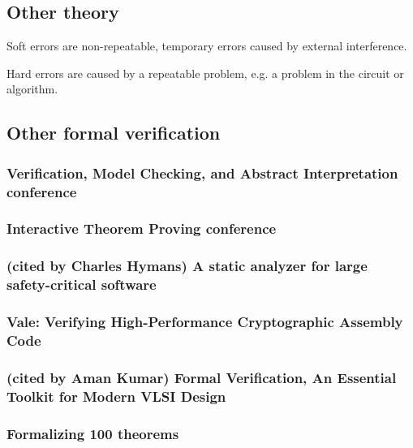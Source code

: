 \documentclass{article}
\begin{document}
\subsection{Other theory}

Soft errors are non-repeatable, temporary errors caused by external interference.

Hard errors are caused by a repeatable problem, e.g. a problem in the circuit or algorithm.


\subsection{Other formal verification}

\subsubsection{Verification, Model Checking, and Abstract Interpretation conference}

\subsubsection{Interactive Theorem Proving conference}

\subsubsection{(cited by Charles Hymans) A static analyzer for large safety-critical software}


\subsubsection{Vale: Verifying {High-Performance} Cryptographic Assembly Code}

\subsubsection{(cited by Aman Kumar) Formal Verification, An Essential Toolkit for Modern VLSI Design} 

\subsubsection{Formalizing 100 theorems}
\end{document}
